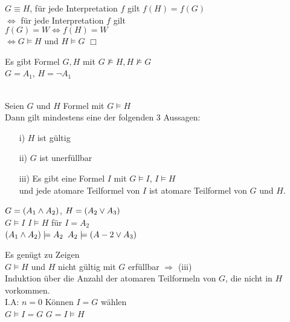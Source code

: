 \beweis{}
$G \equiv H$, für jede Interpretation $f$ gilt $f(H) = f(G)$\\
$\Leftrightarrow$ für jede Interpretation $f$ gilt\\
$f(G) = W \Leftrightarrow f(H) = W$\\
$\Leftrightarrow G \models H$ und $H \models G$ $\Box$

\beispiel{}
Es gibt Formel $G, H$ mit $G \not \models H, H \not \models G$\\
$G = A_1$, $H=\neg A_1$

 \textbf{}\\
Seien $G$ und $H$ Formel mit $G \models H$\\
Dann gilt mindestens eine der folgenden 3 Aussagen:
\begin{itemize}
\item[i)] $H$ ist gültig
\item[ii)] $G$ ist unerfüllbar
\item[iii)] Es gibt eine Formel $I$ mit $G \models I$, $I \models H$\\
und jede atomare Teilformel von $I$ ist atomare Teilformel von $G$ und $H$.
\end{itemize}

\beispiel{}
$G = (A_1 \wedge A_2)$, $H = (A_2 \vee A_3)$\\
$G \models I$ \hspace{1cm} $I \models H$ \hspace{1cm} für $I= A_2$\\
$(A_1 \wedge A_2) \models A_2$ \hspace{1cm} $A_2 \models (A-2 \vee A_3)$

\beweis{}
Es genügt zu Zeigen\\
$G \models H$ und $H$ nicht gültig mit $G$ erfüllbar $\Rightarrow$ (iii)\\

\noindent
Induktion über die Anzahl der atomaren Teilformeln von $G$, die nicht in $H$ vorkommen.\\
I.A: $n=0$ \hspace{1cm} Können $I = G$ wählen\\
$G \models I = G$ \hspace{1cm} $G = I \models H$\\

